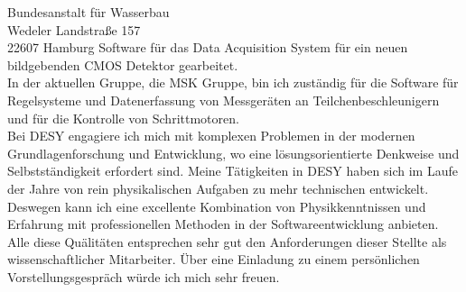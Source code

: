 \documentclass[ebner,paper=a4,fontsize=11pt,ngerman,BCOR=10mm]{scrlttr2}%
\begin{document}
\begin{letter}{Bundesanstalt f\"ur Wasserbau\\
Wedeler Landstra{\ss}e 157\\ 
22607 Hamburg}
Software f{\"u}r das Data Acquisition System f\"ur ein neuen bildgebenden CMOS
Detektor gearbeitet.\\
In der aktuellen Gruppe, die MSK Gruppe, bin ich zust{\"a}ndig f{\"u}r die
Software f{\"u}r Regelsysteme und Datenerfassung von Messger{\"a}ten an
Teilchenbeschleunigern und f{\"u}r die Kontrolle von Schrittmotoren.\\
\indent Bei DESY engagiere ich mich mit komplexen Problemen in der modernen
Grundlagenforschung und Entwicklung, wo eine l{\"o}sungsorientierte Denkweise
und Selbstst\"andigkeit erfordert sind. Meine T{\"a}tigkeiten in DESY haben sich
im Laufe der Jahre von rein physikalischen Aufgaben zu mehr technischen
entwickelt. Deswegen kann ich eine excellente Kombination von Physikkenntnissen
und Erfahrung mit professionellen Methoden in der Softwareentwicklung
anbieten.\\ 
\indent Alle diese Qu{\"a}lit{\"a}ten entsprechen sehr gut den Anforderungen
dieser Stellte als wissenschaftlicher Mitarbeiter. \"Uber eine Einladung zu
einem pers\"onlichen Vorstellungsgespr\"ach w\"urde ich mich sehr freuen.


\end{letter}
\end{document}
